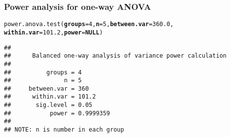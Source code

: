 \documentclass[color=usenames,dvipsnames]{beamer}\usepackage[]{graphicx}\usepackage[]{color}
\makeatletter
\newcommand{\hlnum}[1]{\textcolor[rgb]{0.69,0.494,0}{#1}}%
\newcommand{\hlstd}[1]{\textcolor[rgb]{0,0,0}{#1}}%
\newcommand{\hlkwa}[1]{\textcolor[rgb]{0,0,0}{\textbf{#1}}}%
\newcommand{\hlkwc}[1]{\textcolor[rgb]{0,0,0}{\textbf{#1}}}%
\newcommand{\hlkwd}[1]{\textcolor[rgb]{0.004,0.004,0.506}{#1}}%
\newenvironment{kframe}{%
 \def\at@end@of@kframe{}%
 \ifinner\ifhmode%
  \def\at@end@of@kframe{\end{minipage}}%
  \begin{minipage}{\columnwidth}%
 \fi\fi%
 \def\FrameCommand##1{\hskip\@totalleftmargin \hskip-\fboxsep
 \colorbox{shadecolor}{##1}\hskip-\fboxsep
     \hskip-\linewidth \hskip-\@totalleftmargin \hskip\columnwidth}%
 \MakeFramed {\advance\hsize-\width
   \@totalleftmargin\z@ \linewidth\hsize
   \@setminipage}}%
 {\par\unskip\endMakeFramed%
 \at@end@of@kframe}
\newenvironment{knitrout}{}{} %
\newcommand{\inr}[1]{\colorbox{inlinecolor}{\texttt{#1}}}
\makeatother
\begin{document}
\begin{frame}[fragile]
  \frametitle{Power analysis for one-way ANOVA}
\begin{knitrout}\footnotesize
{}\color{fgcolor}\begin{kframe}
\begin{alltt}
\hlkwd{power.anova.test}\hlstd{(}\hlkwc{groups}\hlstd{=}\hlnum{4}\hlstd{,} \hlkwc{n}\hlstd{=}\hlnum{5}\hlstd{,} \hlkwc{between.var}\hlstd{=}\hlnum{360.0}\hlstd{,}
                 \hlkwc{within.var}\hlstd{=}\hlnum{101.2}\hlstd{,} \hlkwc{power}\hlstd{=}\hlkwa{NULL}\hlstd{)}
\end{alltt}
\begin{verbatim}
## 
##      Balanced one-way analysis of variance power calculation 
## 
##          groups = 4
##               n = 5
##     between.var = 360
##      within.var = 101.2
##       sig.level = 0.05
##           power = 0.9999359
## 
## NOTE: n is number in each group
\end{verbatim}
\end{kframe}
\end{knitrout}
\end{frame}










\end{document}
